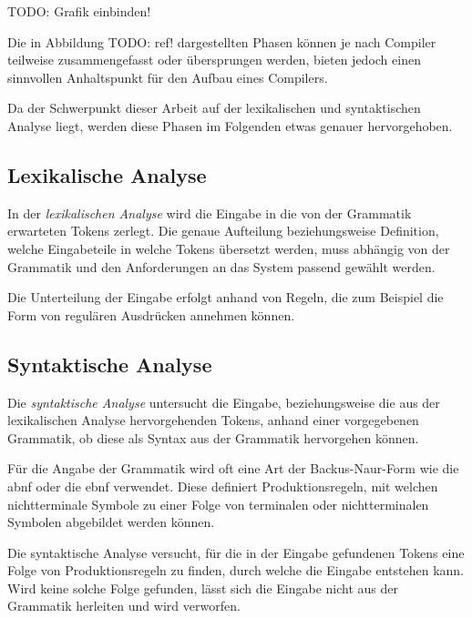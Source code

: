 \documentclass[oneside]{ausarbeitung}
\begin{document}
TODO: Grafik einbinden!
	
Die in Abbildung TODO: ref! dargestellten Phasen können je nach Compiler teilweise zusammengefasst oder übersprungen werden, bieten jedoch einen sinnvollen Anhaltspunkt für den Aufbau eines Compilers.
	
Da der Schwerpunkt dieser Arbeit auf der lexikalischen und syntaktischen Analyse liegt, werden diese Phasen im Folgenden etwas genauer hervorgehoben.
	
	
\subsection{Lexikalische Analyse}
	
In der \textit{lexikalischen Analyse} wird die Eingabe in die von der Grammatik erwarteten Tokens zerlegt. Die genaue Aufteilung beziehungsweise Definition, welche Eingabeteile in welche Tokens übersetzt werden, muss abhängig von der Grammatik und den Anforderungen an das System passend gewählt werden.
	
Die Unterteilung der Eingabe erfolgt anhand von Regeln, die zum Beispiel die Form von regulären Ausdrücken annehmen können. 

	 
	
\subsection{Syntaktische Analyse}
	
Die \textit{syntaktische Analyse} untersucht die Eingabe, beziehungsweise die aus der lexikalischen Analyse hervorgehenden Tokens, anhand einer vorgegebenen Grammatik, ob diese als Syntax aus der Grammatik hervorgehen können. 
	
Für die Angabe der Grammatik wird oft eine Art der Backus-Naur-Form wie die \ac{abnf} oder die {ebnf} verwendet. Diese definiert Produktionsregeln, mit welchen nichtterminale Symbole zu einer Folge von terminalen oder nichtterminalen Symbolen abgebildet werden können. 
	
Die syntaktische Analyse versucht, für die in der Eingabe gefundenen Tokens eine Folge von Produktionsregeln zu finden, durch welche die Eingabe entstehen kann. Wird keine solche Folge gefunden, lässt sich die Eingabe nicht aus der Grammatik herleiten und wird verworfen.
	
	
\end{document}
